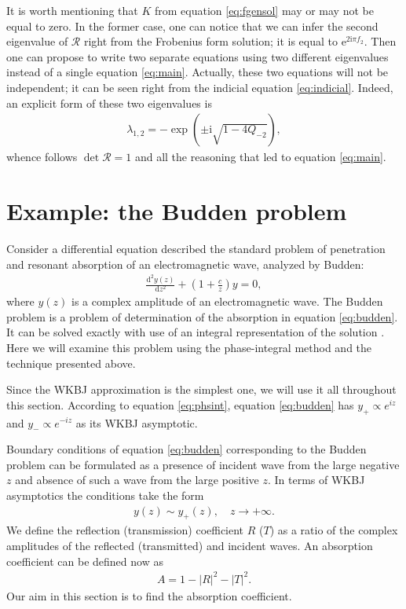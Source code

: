 \documentclass[aip,jmp,reprint]{revtex4-1}
\def\rmi{\mathrm{i}}
\def\rme{\mathrm{e}}
\def\rmd{\mathrm{d}}
\def\R{\bm{\mathcal{R}}}
\begin{document}
It is worth mentioning that $K$ from equation \eqref{eq:fgensol} may or may not be equal to zero. In the
former case, one can notice that we can infer the second eigenvalue of $\R$ right from the
Frobenius form solution; it is equal to $\rme^{2 \rmi \pi f_2}$. Then one can propose to write two
separate equations using two different eigenvalues instead of a single equation \eqref{eq:main}.
Actually, these two equations will not be independent; it can be seen right from the
indicial equation \eqref{eq:indicial}. Indeed, an explicit form of these two eigenvalues is
\begin{eqnarray}
\lambda_{1,2} = - \exp(\pm \rmi \sqrt{1 - 4 Q_{-2}}),
\end{eqnarray}
whence follows $\det\R=1$ and all the reasoning that led to equation \eqref{eq:main}.

\section{Example: the Budden problem \label{sec:budden}}
Consider a differential equation described the standard problem of penetration and 
resonant absorption of an electromagnetic wave, analyzed by Budden:\cite{white-chen,budden}
\begin{eqnarray}
\frac{\rmd^2 y(z)}{\rmd z^2} + (1 + \frac{c}{z})y = 0,  
\label{eq:budden}
\end{eqnarray}
where $y(z)$ is a complex amplitude of an electromagnetic wave.
The Budden problem is a problem of determination of the absorption in equation \eqref{eq:budden}. 
It can be solved exactly with use of an integral representation of the solution \cite{rwbook}.
Here we will examine this problem using the phase-integral method and the technique presented above. 

Since the WKBJ approximation is the simplest one,
we will use it all throughout this section. According to equation \eqref{eq:phsint}, 
equation \eqref{eq:budden} has $y_+ \propto e^{iz}$ and $y_- \propto e^{-iz}$ as its WKBJ asymptotic. 

Boundary conditions of equation \eqref{eq:budden} corresponding to the Budden problem can be
formulated as a presence of incident wave from the large negative $z$ and absence of such 
a wave from the large positive $z$. In terms of WKBJ asymptotics the conditions take the form
\begin{eqnarray}
y(z) \sim y_+(z), \quad z \rightarrow +\infty.  
\label{eq:bbound}
\end{eqnarray}
We define the reflection (transmission) coefficient $R$ ($T$) as
a ratio of the complex amplitudes of the reflected (transmitted) and incident waves. 
An absorption coefficient can be defined now as 
\begin{eqnarray}
A = 1 - |R|^2 - |T|^2.  
\label{eq:absdef}
\end{eqnarray}
Our aim in this section is to find the absorption coefficient.
\end{document}
